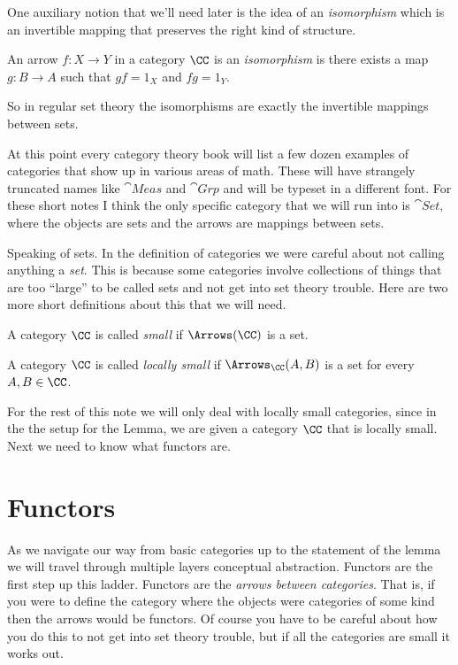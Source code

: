 \documentclass[12pt]{article}
\begin{document}
One auxiliary notion that we'll need later is the idea of an {\it isomorphism} which is an invertible mapping that preserves the right kind of structure.

\begin{defn}
An arrow $f: X \to Y$ in a category $\CC$ is an {\it isomorphism} is there exists a map $g: B \to A$ such that $gf = 1_X$ and $fg = 1_Y$.
\end{defn}

So in regular set theory the isomorphisms are exactly the invertible mappings between sets.

At this point every category theory book will list a few dozen examples of categories that show up in various areas of math. These will have strangely truncated names like $\cat{Meas}$ and $\cat{Grp}$ and will be typeset in a different font. For these short notes I think the only specific category that we will run into is $\cat{Set}$, where the objects are sets and the arrows are mappings between sets.

Speaking of sets. In the definition of categories we were careful about not calling anything a {\it set}. This is because some categories involve collections of things that are too ``large'' to be called sets and not get into set theory trouble. Here are two more short definitions about this that we will need.

\begin{defn}
A category $\CC$ is called {\it small} if $\Arrows(\CC)$ is a set.
\end{defn}

\begin{defn}
A category $\CC$ is called {\it locally small} if $\Arrows_{\CC}(A,B)$ is a set for every $A, B \in \CC$.
\end{defn}%
\noindent
For the rest of this note we will only deal with locally small categories, since in the the setup for the Lemma, we are given a category $\CC$ that is locally small. Next we need to know what functors are.

\section{Functors}

As we navigate our way from basic categories up to the statement of the lemma we will travel through multiple layers conceptual abstraction. Functors are the first step up this ladder. Functors are the {\it arrows between categories}. That is, if you were to define the category where the objects were  categories of some kind then the arrows would be functors. Of course you have to be careful about how you do this to not get into set theory trouble, but if all the categories are small it works out.
\end{document}
